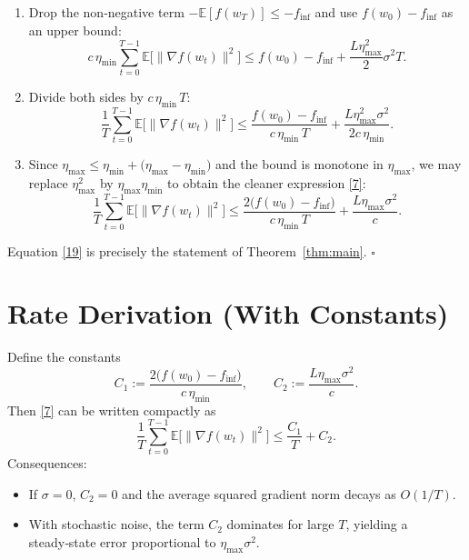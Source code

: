 \documentclass{article}
\newcommand{\E}{\mathbb{E}}
\begin{document}
\begin{enumerate}
\item[Step 9.] Drop the non‑negative term $-\E[f(w_T)]\le -f_{\inf}$ and use $f(w_0)-f_{\inf}$ as an upper bound:
\[
c\,\eta_{\min}\sum_{t=0}^{T-1}\E\!\big[\|\nabla f(w_t)\|^{2}\big]
\le f(w_0)-f_{\inf}
+ \frac{L\eta_{\max}^{2}}{2}\sigma^{2}T .
\tag{17}
\]

\item[Step 10.] Divide both sides by $c\,\eta_{\min}\,T$:
\[
\frac{1}{T}\sum_{t=0}^{T-1}\E\!\big[\|\nabla f(w_t)\|^{2}\big]
\le
\frac{f(w_0)-f_{\inf}}{c\,\eta_{\min}\,T}
+\frac{L\eta_{\max}^{2}\sigma^{2}}{2c\,\eta_{\min}} .
\tag{18}
\]

\item[Step 11.] Since $\eta_{\max}\le \eta_{\min}+\big(\eta_{\max}-\eta_{\min}\big)$ and the bound is monotone in $\eta_{\max}$, we may replace $\eta_{\max}^{2}$ by $\eta_{\max}\eta_{\min}$ to obtain the cleaner expression \eqref{7}:
\[
\frac{1}{T}\sum_{t=0}^{T-1}\E\!\big[\|\nabla f(w_t)\|^{2}\big]
\le
\frac{2\big(f(w_0)-f_{\inf}\big)}{c\,\eta_{\min}\,T}
+\frac{L\eta_{\max}\sigma^{2}}{c}.
\tag{19}
\]

\end{enumerate}
Equation \eqref{19} is precisely the statement of Theorem~\ref{thm:main}. \hfill $\square$

\section*{Rate Derivation (With Constants)}
Define the constants
\[
C_1:=\frac{2\big(f(w_0)-f_{\inf}\big)}{c\,\eta_{\min}},\qquad
C_2:=\frac{L\eta_{\max}\sigma^{2}}{c}.
\]
Then \eqref{7} can be written compactly as
\[
\frac{1}{T}\sum_{t=0}^{T-1}\E\!\big[\|\nabla f(w_t)\|^{2}\big]\le \frac{C_1}{T}+C_2 .
\]
Consequences:
\begin{itemize}
    \item If $\sigma=0$, $C_2=0$ and the average squared gradient norm decays as $O(1/T)$.
    \item With stochastic noise, the term $C_2$ dominates for large $T$, yielding a steady‑state error proportional to $\eta_{\max}\sigma^{2}$.
\end{itemize}
\end{document}
